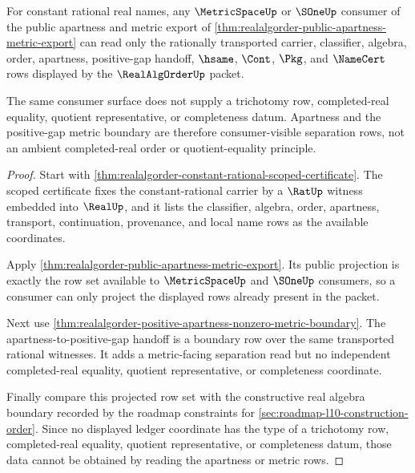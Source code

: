 \begin{theorem}
\label{thm:realalgorder-apartness-metric-consumer-separation}
For constant rational real names, any $\MetricSpaceUp$ or $\SOneUp$ consumer of
the public apartness and metric export of
\autoref{thm:realalgorder-public-apartness-metric-export} can read only the
rationally transported carrier, classifier, algebra, order, apartness,
positive-gap handoff, $\hsame$, $\Cont$, $\Pkg$, and $\NameCert$ rows displayed
by the $\RealAlgOrderUp$ packet.

The same consumer surface does not supply a trichotomy row, completed-real
equality, quotient representative, or completeness datum. Apartness and the
positive-gap metric boundary are therefore consumer-visible separation rows,
not an ambient completed-real order or quotient-equality principle.
\end{theorem}
\begin{proof}
Start with
\autoref{thm:realalgorder-constant-rational-scoped-certificate}. The scoped
certificate fixes the constant-rational carrier by a $\RatUp$ witness embedded
into $\RealUp$, and it lists the classifier, algebra, order, apartness,
transport, continuation, provenance, and local name rows as the available
coordinates.

Apply \autoref{thm:realalgorder-public-apartness-metric-export}. Its public
projection is exactly the row set available to $\MetricSpaceUp$ and $\SOneUp$
consumers, so a consumer can only project the displayed rows already present in
the packet.

Next use
\autoref{thm:realalgorder-positive-apartness-nonzero-metric-boundary}. The
apartness-to-positive-gap handoff is a boundary row over the same transported
rational witnesses. It adds a metric-facing separation read but no independent
completed-real equality, quotient representative, or completeness coordinate.

Finally compare this projected row set with the constructive real algebra
boundary recorded by the roadmap constraints for
\autoref{sec:roadmap-l10-construction-order}. Since no displayed ledger
coordinate has the type of a trichotomy row, completed-real equality,
quotient representative, or completeness datum, those data cannot be obtained
by reading the apartness or metric rows.
\end{proof}

